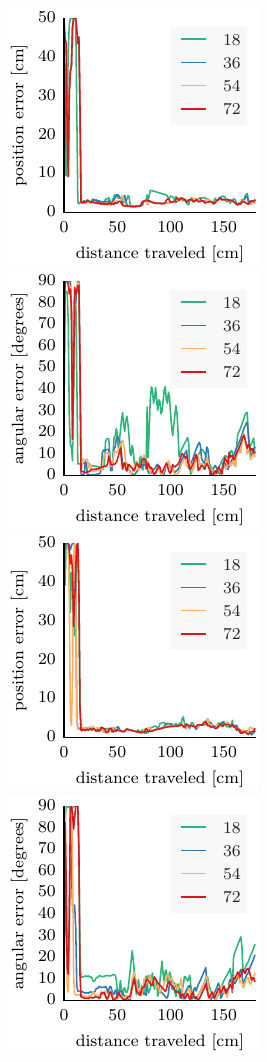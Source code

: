 \documentclass[letterpaper, 10pt, conference]{ieeeconf}
\begin{document}
\begin{figure}
\includegraphics{ml-whole_random_1-xy}
\includegraphics{ml-whole_random_1-theta}\hfill
\includegraphics{ml-whole_random_2-xy}
\includegraphics{ml-whole_random_2-theta}


\end{figure}
\end{document}
